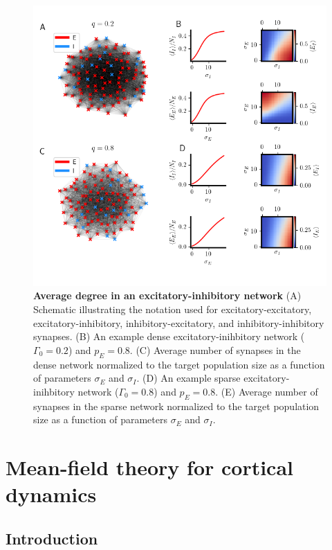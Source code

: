 \documentclass{ucetd}
\begin{document}
\clearpage
\begin{figure}[t!]
\centering
\includegraphics[width=165mm]{fig_10}
\caption{\textbf{Average degree in an excitatory-inhibitory network} (A) Schematic illustrating the notation used for excitatory-excitatory, excitatory-inhibitory, inhibitory-excitatory, and inhibitory-inhibitory synapses. (B) An example dense excitatory-inihbitory network ($\Gamma_{0}=0.2$) and $p_{E} = 0.8$. (C) Average number of synapses in the dense network normalized to the target population size as a function of parameters $\sigma_{E}$ and $\sigma_{I}$. (D) An example sparse excitatory-inihbitory network ($\Gamma_{0}=0.8$) and $p_{E} = 0.8$. (E) Average number of synapses in the sparse network normalized to the target population size as a function of parameters $\sigma_{E}$ and $\sigma_{I}$.}
\end{figure}

\chapter{Mean-field theory for cortical dynamics}

\section{Introduction}
\end{document}

